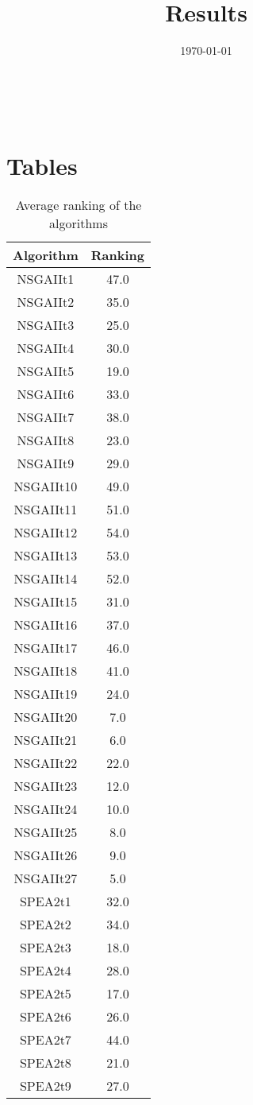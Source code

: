 \documentclass{article}
\title{Results}
\author{}
\date{\today}
\begin{document}
\oddsidemargin 0in \topmargin 0in\maketitle
\
\section{Tables}
\begin{table}[!htp]
\centering
\caption{Average ranking of the algorithms}
\begin{tabular}{c|c}
Algorithm&Ranking\\
\hline
NSGAIIt1&47.0\\
NSGAIIt2&35.0\\
NSGAIIt3&25.0\\
NSGAIIt4&30.0\\
NSGAIIt5&19.0\\
NSGAIIt6&33.0\\
NSGAIIt7&38.0\\
NSGAIIt8&23.0\\
NSGAIIt9&29.0\\
NSGAIIt10&49.0\\
NSGAIIt11&51.0\\
NSGAIIt12&54.0\\
NSGAIIt13&53.0\\
NSGAIIt14&52.0\\
NSGAIIt15&31.0\\
NSGAIIt16&37.0\\
NSGAIIt17&46.0\\
NSGAIIt18&41.0\\
NSGAIIt19&24.0\\
NSGAIIt20&7.0\\
NSGAIIt21&6.0\\
NSGAIIt22&22.0\\
NSGAIIt23&12.0\\
NSGAIIt24&10.0\\
NSGAIIt25&8.0\\
NSGAIIt26&9.0\\
NSGAIIt27&5.0\\
SPEA2t1&32.0\\
SPEA2t2&34.0\\
SPEA2t3&18.0\\
SPEA2t4&28.0\\
SPEA2t5&17.0\\
SPEA2t6&26.0\\
SPEA2t7&44.0\\
SPEA2t8&21.0\\
SPEA2t9&27.0\\

\end{tabular}
\end{table}
\end{document}
